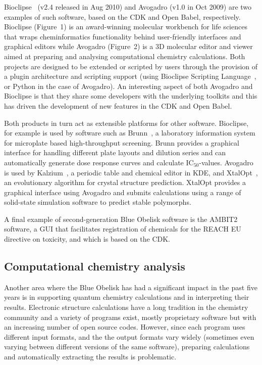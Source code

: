\documentclass[10pt]{bmc_article}
\newenvironment{bmcformat}{\fussy\setboolean{publ}{true}}{\fussy}
\begin{document}
\begin{bmcformat}
Bioclipse~\cite{Spjuth:2007fk} (v2.4 released in Aug 2010) and Avogadro
\cite{WebAvogadro} (v1.0 in Oct 2009) are two examples of such software, based
on the CDK and Open Babel, respectively. Bioclipse (Figure~1) is an award-winning
molecular workbench for life sciences
that wraps cheminformatics functionality behind user-friendly interfaces and
graphical editors while Avogadro (Figure~2) is a 3D molecular editor and viewer aimed at
preparing and analysing computational chemistry calculations. Both
projects are designed to be extended or scripted by users through
the provision of a plugin architecture and scripting support (using
Bioclipse Scripting Language~\cite{Bioclipse2}, or Python in the case
of Avogadro). An interesting aspect of both Avogadro and Bioclipse is
that they share some developers with the underlying toolkits and this
has driven the development of new features in the CDK and Open Babel.

Both products in turn act as extensible platforms for other
software. Bioclipse, for example is used by software
such as Brunn~\cite{Alvarsson:2011fk}, a laboratory information system for
microplate based high-throughput screening. Brunn provides a graphical interface
for handling different plate layouts and dilution series and can automatically
generate dose response curves and calculate IC$_{50}$-values. Avogadro
is used by Kalzium~\cite{WebKalzium}, a periodic table and chemical editor in KDE,
and XtalOpt~\cite{WebXtalOpt, Lonie2011}, an evolutionary
algorithm for crystal structure prediction. XtalOpt provides a
graphical interface using Avogadro and submits calculations using a
range of solid-state simulation software to predict stable polymorphs.

A final example of second-generation Blue Obelisk software is the 
AMBIT2~\cite{Jeliazkova2011} software, a GUI that facilitates registration
of chemicals for the REACH EU directive on toxicity, and which is
based on the CDK.

\subsection*{Computational chemistry analysis}

Another area where the Blue Obelisk has had a significant impact in the
past five years is in supporting
quantum chemistry calculations and in interpreting their results.
Electronic structure calculations have a long tradition in the
chemistry community and a variety of programs exist, mostly
proprietary software but with an increasing number of open source codes.
However, since each program uses different input formats, and the
the output formats vary widely (sometimes even varying between different versions
of the same software), preparing calculations and automatically extracting
the results is problematic. 


\end{bmcformat}
\end{document}
